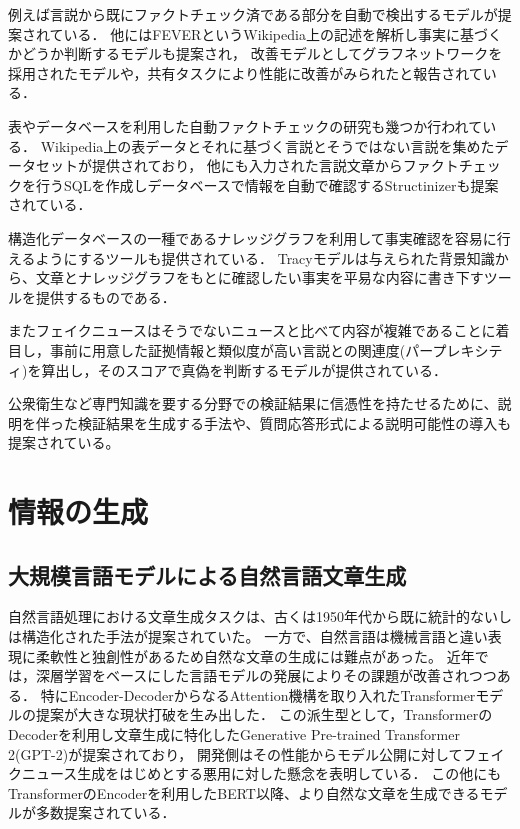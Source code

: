 例えば言説から既にファクトチェック済である部分を自動で検出するモデル\cite{shaar-etal-2020-known}が提案されている．
他にはFEVERというWikipedia上の記述を解析し事実に基づくかどうか判断するモデルも提案され\cite{thorne-etal-2018-fever}，
改善モデルとしてグラフネットワークを採用されたモデル\cite{zhong-etal-2020-reasoning}や，共有タスクにより性能に改善がみられたと報告されている\cite{thorne-etal-2019-fever2}．

表やデータベースを利用した自動ファクトチェックの研究も幾つか行われている．
Wikipedia上の表データとそれに基づく言説とそうではない言説を集めたデータセットが提供されており\cite{chen2020tabfact}，
他にも入力された言説文章からファクトチェックを行うSQLを作成しデータベースで情報を自動で確認するStructinizer\cite{10.14778/3407790.3407841}も提案されている．

構造化データベースの一種であるナレッジグラフを利用して事実確認を容易に行えるようにするツールも提供されている．
Tracyモデルは与えられた背景知識から、文章とナレッジグラフをもとに確認したい事実を平易な内容に書き下すツールを提供するものである\cite{10.1145/3308558.3314126}．

またフェイクニュースはそうでないニュースと比べて内容が複雑であることに着目し，事前に用意した証拠情報と類似度が高い言説との関連度(パープレキシティ)を算出し，そのスコアで真偽を判断するモデルが提供されている\cite{lee2020misinformation}．

公衆衛生など専門知識を要する分野での検証結果に信憑性を持たせるために、説明を伴った検証結果を生成する手法\cite{kotonya-toni-2020-explainable-automated}や、質問応答形式による説明可能性の導入\cite{9747214}も提案されている。


\section{情報の生成}

\subsection{大規模言語モデルによる自然言語文章生成}
自然言語処理における文章生成タスクは、古くは1950年代から既に統計的ないしは構造化された手法\cite{Fine1998,10.1162/089120102762671972}が提案されていた。
一方で、自然言語は機械言語と違い表現に柔軟性と独創性があるため自然な文章の生成には難点があった。
近年では，深層学習をベースにした言語モデルの発展によりその課題が改善されつつある．
特にEncoder-DecoderからなるAttention機構を取り入れたTransformerモデルの提案\cite{NIPS2017_3f5ee243}が大きな現状打破を生み出した．
この派生型として，TransformerのDecoderを利用し文章生成に特化したGenerative Pre-trained Transformer 2(GPT-2)が提案\cite{Radford_GPT2}されており，
開発側はその性能からモデル公開に対してフェイクニュース生成をはじめとする悪用に対した懸念を表明している\cite{solaiman_clark_brundage_2020}．
この他にもTransformerのEncoderを利用したBERT\cite{devlin2019bert}以降、より自然な文章を生成できるモデルが多数提案されている．

